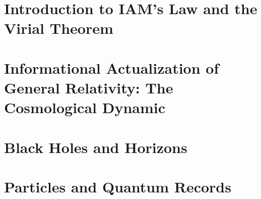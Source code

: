 \documentclass[11pt,oneside,openany]{book}
\begin{document}
\frontmatter
\maketitle

\tableofcontents



\mainmatter

\part{Introduction to IAM's Law and the Virial Theorem}\label{part:1}




\part{Informational Actualization of General Relativity: The Cosmological Dynamic}\label{part:2}























\part{Black Holes and Horizons}\label{part:bh}





\part{Particles and Quantum Records}\label{part:qp}









\end{document}
